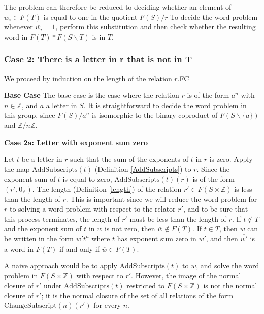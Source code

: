 \documentclass[12pt]{article} %
\theoremstyle{definition}
\theoremstyle{definition}
\theoremstyle{definition}
\theoremstyle{definition}
\theoremstyle{definition}
\theoremstyle{definition}
\begin{document}
The problem can therefore be reduced to deciding whether an element of
$w_i \in F(T)$ is equal to one in the quotient $F(S) /r$
To decide the word problem whenever $\overline{w_i} = 1$, perform this substitution and
then check whether the resulting word in $F(T) \ast F(S \backslash T)$ is in $T$.

\subsubsection{Case 2: There is a letter in r that is not in T}\label{xandt}

We proceed by induction on the length of the relation $r$.FC

\textbf{Base Case}
The base case is the case where the relation $r$ is of the form $a^n$ with
$n \in \mathbb{Z}$, and $a$ a letter in $S$. It is straightforward to decide
the word problem in this group, since $F(S) / a^n$ is isomorphic
to the binary coproduct of $F(S \backslash \{a\})$ and $\mathbb{Z}/n\mathbb{Z}$.

\textbf{Case 2a: Letter with exponent sum zero}\label{expsumzero}

Let $t$ be a letter in $r$ such that the sum of the exponents of $t$
in $r$ is zero.
Apply the map $\text{AddSubscripts}(t)$ (Definition \ref{AddSubscripts}) to $r$.
Since the exponent sum of $t$ is equal to zero, $\text{AddSubscripts}(t)(r)$ is
of the form $(r', 0_\mathbb{Z})$.
The length (Definition \ref{length}) of the relation $r' \in F(S \times \mathbb{Z})$
is less than the length of $r$. This is important since we will reduce the word problem
for $r$ to solving a word problem with respect to the relator $r'$,
and to be sure that this process terminates,
the length of $r'$ must be less than the length of $r$.
If $t \notin T$ and the exponent sum of $t$ in $w$ is not zero,
then $\overline{w} \notin \overline{F(T)}$.
If $t \in T$, then $w$ can be written in the
form $w' t^n$ where $t$ has exponent sum zero in $w'$,
and then $\overline{w'}$ is a word in $\overline{F(T)}$ if
and only if $\overline{w} \in \overline{F(T)}$.

A naive approach would be to apply $\text{AddSubscripts}(t)$ to $w$, and solve the word
problem in $F(S \times \mathbb{Z})$ with respect to $r'$.
However, the image of the normal closure of $r'$ under $\text{AddSubscripts}(t)$ restricted
to $F(S \times \mathbb{Z})$ is not the normal closure of $r'$; it is the normal closure of
the set of all relations of the form $\text{ChangeSubscript}(n)(r')$ for every $n$.
\end{document}
